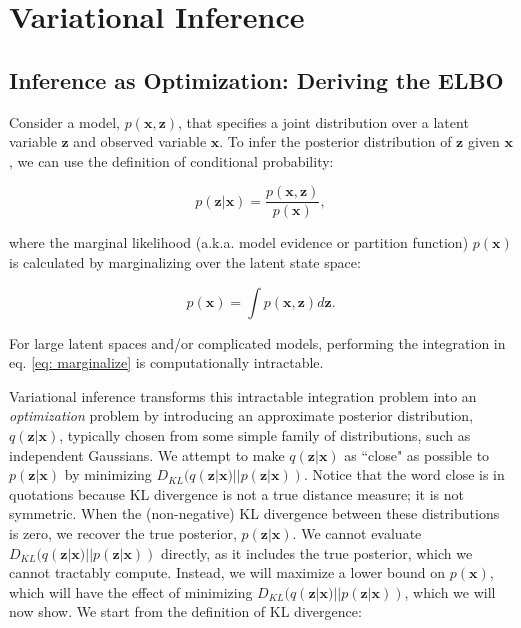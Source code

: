 \chapter{Variational Inference}

\section{Inference as Optimization: Deriving the ELBO}

Consider a model, $p(\mathbf{x}, \mathbf{z})$, that specifies a joint distribution over a latent variable $\mathbf{z}$ and observed variable $\mathbf{x}$. To infer the posterior distribution of $\mathbf{z}$ given $\mathbf{x}$, we can use the definition of conditional probability:

\begin{equation}
	p (\mathbf{z} | \mathbf{x}) = \frac{p(\mathbf{x}, \mathbf{z})}{p (\mathbf{x})},
	\label{eq: bayes rule}
\end{equation}

\noindent where the marginal likelihood (a.k.a. model evidence or partition function) $p(\mathbf{x})$ is calculated by marginalizing over the latent state space:

\begin{equation}
	p (\mathbf{x}) = \int p(\mathbf{x}, \mathbf{z}) d\mathbf{z}.
	\label{eq: marginalize}
\end{equation}

 \noindent For large latent spaces and/or complicated models, performing the integration in eq. \ref{eq: marginalize} is computationally intractable.
 
 Variational inference transforms this intractable integration problem into an \textit{optimization} problem by introducing an approximate posterior distribution, $q (\mathbf{z} | \mathbf{x})$, typically chosen from some simple family of distributions, such as independent Gaussians. We attempt to make $q (\mathbf{z} | \mathbf{x})$ as ``close" as possible to $p (\mathbf{z} | \mathbf{x})$ by minimizing $ D_{KL}(q (\mathbf{z} | \mathbf{x}) || p (\mathbf{z} | \mathbf{x}))$. Notice that the word close is in quotations because KL divergence is not a true distance measure; it is not symmetric. When the (non-negative) KL divergence between these distributions is zero, we recover the true posterior, $p (\mathbf{z} | \mathbf{x})$. We cannot evaluate $ D_{KL}(q (\mathbf{z} | \mathbf{x}) || p (\mathbf{z} | \mathbf{x}))$ directly, as it includes the true posterior, which we cannot tractably compute. Instead, we will maximize a lower bound on $p(\mathbf{x})$, which will have the effect of minimizing $ D_{KL}(q (\mathbf{z} | \mathbf{x}) || p (\mathbf{z} | \mathbf{x}))$, which we will now show. We start from the definition of KL divergence:
 
